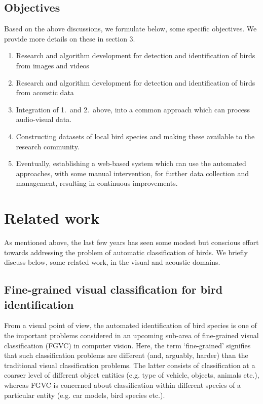 \documentclass{article}
\begin{document}
\subsection{Objectives}
Based on the above discussions, we formulate below, some specific objectives. We provide more details on these in section 3.  
\begin{enumerate}
\item Research and algorithm development for detection and identification of birds from images and videos
\item Research and algorithm development for detection and identification of birds from acoustic data
\item Integration of 1.~and 2.~above, into a common approach which can process audio-visual data. 
\item Constructing datasets of local bird species and making these available to the research community.
\item Eventually, establishing a web-based system which can use the automated
approaches, with some manual intervention, for further data collection and management, resulting in continuous improvements.
\end{enumerate}

\section{Related work}
As mentioned above, the last few years has seen some modest but conscious effort towards addressing the problem of automatic classification of birds. We briefly discuss below, some related work, in the visual and acoustic domains.

\subsection{Fine-grained visual classification for bird identification}
From a visual point of view, the automated identification of bird species is one of the important problems considered in an upcoming sub-area of fine-grained visual classification (FGVC) in computer vision. Here, the term `fine-grained' signifies that such classification problems are different (and, arguably, harder) than the traditional visual classification problems. The latter consists of classification at a coarser level of different object entities (e.g. type of vehicle, objects, animals etc.), whereas FGVC is concerned about classification within different species of a particular entity (e.g. car models, bird species etc.).
\end{document}
